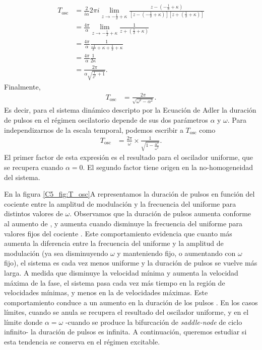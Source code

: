 {\begin{align}
   T_{\text{osc}} &= \frac{2}{i\alpha} 2\pi i \lim_{z \to -\frac{1}{\delta} + \kappa} \frac{z-(-\frac{1}{\delta} + \kappa)}{[z-(-\frac{1}{\delta} + \kappa)][z + (\frac{1}{\delta} + \kappa)] } \label{ch4_eq:integracion_polos}\\
    &= \frac{4\pi}{\alpha} \lim_{z \to -\frac{1}{\delta} + \kappa} \frac{1}{z + (\frac{1}{\delta} + \kappa)} \nonumber \\
     &= \frac{4\pi}{\alpha}  \frac{1}{\frac{-1}{\delta} + \kappa + \frac{1}{\delta} + \kappa} \nonumber \\
     &=\frac{4\pi}{\alpha}  \frac{1}{2 \kappa} \nonumber\\
     &= \frac{2\pi}{\alpha \sqrt{\frac{1}{\delta^{2}} + 1}}. \nonumber
     \end{align}
Finalmente, 
\begin{align}
       T_{\text{osc}} &= \frac{2\pi}{\sqrt{\omega^{2}-\alpha^{2}}}.
      \label{C5_eq:T_osc}
\end{align}
Es decir, para el sistema dinámico descripto por la Ecuación de Adler la duración de pulsos en el régimen oscilatorio depende de sus dos parámetros $\alpha$ y $\omega$. Para independizarnos de la escala temporal, podemos escribir a $T_{\text{osc}}$ como
\begin{align}
    T_{\text{osc}} &= \frac{2\pi}{\omega} \times \frac{1}{\sqrt{1-\frac{\alpha^{2}}{\omega^{2}}}}.
\end{align}
El primer factor de esta expresión es el resultado para el oscilador uniforme, que se recupera cuando $\alpha = 0$. El segundo factor tiene origen en la no-homogeneidad del sistema. 


En la figura \ref{C5_fig:T_osc}A representamos la duración de pulsos en función del cociente entre la amplitud de modulación y la frecuencia del uniforme \dddelta para distintos valores de $\omega$. Observamos que la duración de pulsos aumenta conforme al aumento de \dddelta, y aumenta cuando disminuye la frecuencia del uniforme para valores fijos del cociente \dddelta. Este comportamiento evidencia que cuanto más aumenta la diferencia entre la frecuencia del uniforme y la amplitud de modulación (ya sea disminuyendo $\omega$ y manteniendo \dddelta fijo, o aumentando \dddelta con $\omega$ fijo), el sistema es cada vez menos uniforme y la duración de pulsos se vuelve más larga. A medida que disminuye la velocidad mínima y aumenta la velocidad máxima de la fase, el sistema pasa cada vez más tiempo en la región de velocidades mínimas, y menos en la de velocidades máximas. Este comportamiento conduce a un aumento en la duración de los pulsos \cite{Strogatz1994}. En los casos límites, cuando \dddelta se anula se recupera el resultado del oscilador uniforme, y en el límite donde $\alpha = \omega$ -cuando se produce la bifurcación de \textit{saddle-node} de ciclo infinito- la duración de pulsos es infinita. A continuación, queremos estudiar si esta tendencia se conserva en el régimen excitable. 


}
